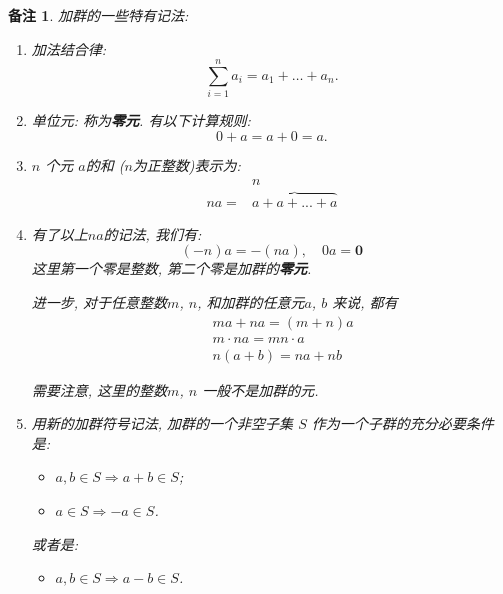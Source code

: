 \documentclass[utf8]{ctexbook}
\newtheorem{memo}{备注}[section]
\begin{document}
\begin{memo}
加群的一些特有记法:
\begin{enumerate}
\item{加法结合律: $$ \sum_{i=1} ^n a_i = a_1 + \ldots + a_n . $$}
\item{单位元: 称为\textbf{零元}. 有以下计算规则:
$$ 0 + a = a + 0 = a .$$
}
\item{$n$ 个元 $a$的和 ($n$为正整数)表示为:
\begin{equation}
\begin{array}{cc}
 & n \\ 
 n a  = & \overbrace{a + a + ... + a} 
\end{array}
\end{equation}
}
\item{有了以上$na$的记法, 我们有:
\begin{equation}
(-n)a = - (na), \quad 0 a = \mathbf{0}
\end{equation}
这里第一个零是整数, 第二个零是加群的\textbf{零元}.

进一步, 对于任意整数$m$, $n$, 和加群的任意元$a$, $b$ 来说, 都有
\begin{eqnarray}
& & ma + na = (m+n) a \\
& & m \cdot n a = m n \cdot a \\
& & n(a+b) = na + nb 
\end{eqnarray} 

需要注意, 这里的整数$m$, $n$ 一般不是加群的元. 
}
\item{用新的加群符号记法, 加群的一个非空子集 $S$ 作为一个子群的充分必要条件是:
\begin{itemize}
\item{$a, b \in S \Rightarrow a + b \in S$;}
\item{$a \in S \Rightarrow -a \in S$.}

\end{itemize}
或者是:
\begin{itemize}
\item{$a, b \in S \Rightarrow a-b \in S$.}
\end{itemize}
}
\end{enumerate}
\end{memo}
\end{document}
